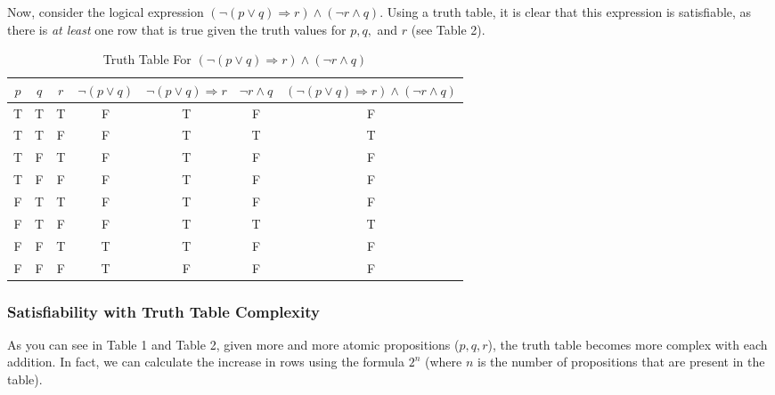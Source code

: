 \documentclass{article}
\begin{document}
            
\newpage





            \noindent Now, consider the logical expression $(\neg(p \lor q) \Rightarrow r) \land (\neg r \land q)$. Using a truth table, it is clear that this expression is satisfiable, as there is \textit{at least} one row that is true given the truth values for $p, q,$ and $r$ (see Table 2).
            
            \vspace{0.5cm}
    
            \begin{table}[htbp]
                \centering
                \begin{tabular}{c|c|c||c|c|c|c}
                    $p$ & $q$ & $r$ & $\neg(p \lor q)$ & $\neg(p \lor q) \Rightarrow r$ & $\neg r \land q$ & $(\neg(p \lor q) \Rightarrow r) \land (\neg r \land q)$ \\
                    \hline
                    T & T & T & F & T & F & F \\
                    T & T & F & F & T & T & T \\
                    T & F & T & F & T & F & F \\
                    T & F & F & F & T & F & F \\
                    F & T & T & F & T & F & F \\
                    F & T & F & F & T & T & T \\
                    F & F & T & T & T & F & F \\
                    F & F & F & T & F & F & F \\
                \end{tabular}
                \caption{Truth Table For $(\neg(p \lor q) \Rightarrow r) \land (\neg r \land q)$}
            \end{table}

        \subsubsection{Satisfiability with Truth Table Complexity}

            As you can see in Table 1 and Table 2, given more and more atomic propositions ($p, q, r$), the truth table becomes more complex with each addition. In fact, we can calculate the increase in rows using the formula $2^n$ (where $n$ is the number of propositions that are present in the table). \\ 
\end{document}
